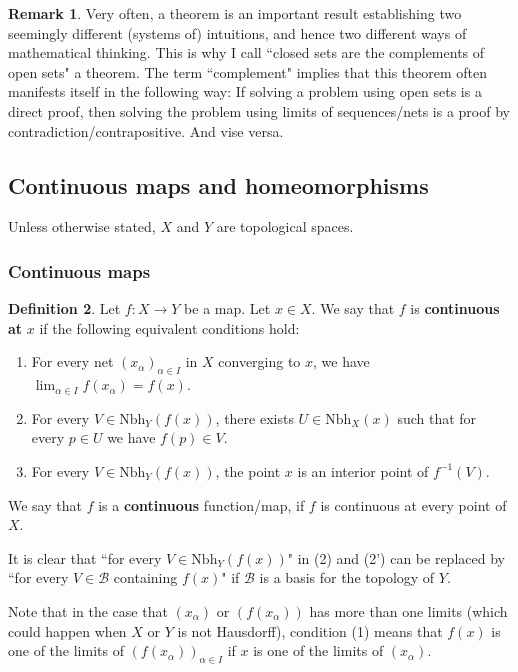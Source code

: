 \documentclass[12pt,b5paper,notitlepage]{article}
\theoremstyle{definition}
\newtheorem{df}{Definition}[section]
\newtheorem{rem}[df]{Remark}
\theoremstyle{plain}
\newcommand{\mc}{\mathcal}
\newcommand{\Nbh}{\mathrm{Nbh}}
\numberwithin{equation}{section}
\begin{document}
\begin{rem}
Very often, a theorem is an important result establishing two seemingly different (systems of) intuitions, and hence two different ways of mathematical thinking. This is why I call ``closed sets are the complements of open sets" a theorem. The term ``complement" implies that this theorem often manifests itself in the following way: If solving a problem using open sets is a direct proof, then solving the problem using limits of sequences/nets is a proof by contradiction/contrapositive. And vise versa.
\end{rem}


\subsection{Continuous maps and homeomorphisms}



Unless otherwise stated,  $X$ and $Y$ are topological spaces.


\subsubsection{Continuous maps}



\begin{df}\label{lb188}
Let $f:X\rightarrow Y$ be a map. Let $x\in X$. We say that $f$ is \textbf{continuous at}  $x$ if the following equivalent conditions hold:
\begin{enumerate}
\item[(1)] For every net $(x_\alpha)_{\alpha\in I}$ in $X$ converging to $x$, we have $\lim_{\alpha\in I}f(x_\alpha)=f(x)$.
\item[(2)] For every $V\in \Nbh_Y(f(x))$, there exists $U\in\Nbh_X(x)$ such that for every $p\in U$ we have $f(p)\in V$.
\item[(2')] For every $V\in \Nbh_Y(f(x))$, the point $x$ is an interior point of $f^{-1}(V)$.
\end{enumerate}
We say that $f$ is a \textbf{continuous} function/map, if $f$ is continuous at every point of $X$. 
\end{df}

It is clear that ``for every $V\in\Nbh_{Y}(f(x))$" in (2) and (2') can be replaced by ``for every $V\in\mc B$ containing $f(x)$" if $\mc B$ is a basis for the topology of $Y$. 

Note that in the case that $(x_\alpha)$ or $(f(x_\alpha))$ has more than one limits (which could happen when $X$ or $Y$ is not Hausdorff), condition (1) means that $f(x)$ is one of the limits of $(f(x_\alpha))_{\alpha\in I}$ if $x$ is one of the limits of $(x_\alpha)$.
\end{document}
